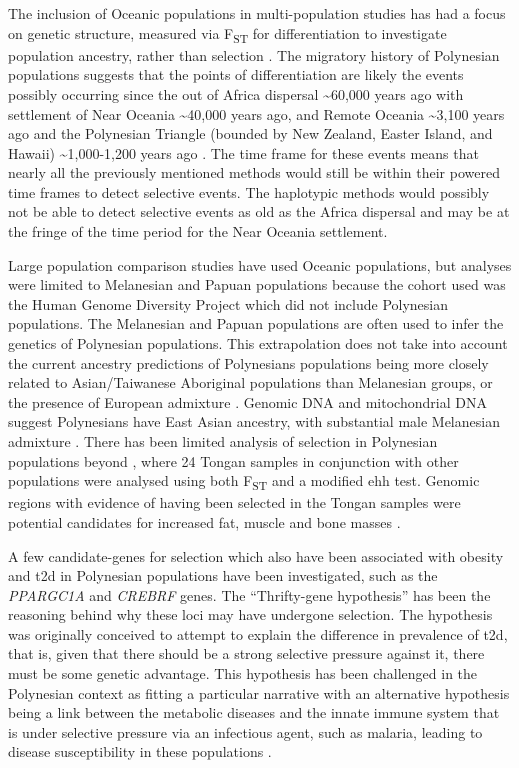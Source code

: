 \documentclass[twoside,openright]{report}
\begin{document}
The inclusion of Oceanic populations in multi-population studies has had
a focus on genetic structure, measured via F\textsubscript{ST} for
differentiation to investigate population ancestry, rather than
selection \citep{Friedlaender2008, Tennessen2011}. The migratory history
of Polynesian populations suggests that the points of differentiation
are likely the events possibly occurring since the out of Africa
dispersal \textasciitilde{}60,000 years ago \citep{Soares2012} with
settlement of Near Oceania \textasciitilde{}40,000 years ago, and Remote
Oceania \textasciitilde{}3,100 years ago \citep{Matisoo-Smith2004} and
the Polynesian Triangle (bounded by New Zealand, Easter Island, and
Hawaii) \textasciitilde{}1,000-1,200 years ago \citep{Wilmshurst2011}.
The time frame for these events means that nearly all the previously
mentioned methods would still be within their powered time frames to
detect selective events. The haplotypic methods would possibly not be
able to detect selective events as old as the Africa dispersal and may
be at the fringe of the time period for the Near Oceania settlement.

Large population comparison studies have used Oceanic populations, but
analyses were limited to Melanesian and Papuan populations because the
cohort used was the Human Genome Diversity Project \citep{Cann2002}
which did not include Polynesian populations. The Melanesian and Papuan
populations are often used to infer the genetics of Polynesian
populations. This extrapolation does not take into account the current
ancestry predictions of Polynesians populations being more closely
related to Asian/Taiwanese Aboriginal populations than Melanesian
groups, or the presence of European admixture \citep{Friedlaender2008}.
Genomic DNA and mitochondrial DNA suggest Polynesians have East Asian
ancestry, with substantial male Melanesian admixture
\citep{Kayser2008a}. There has been limited analysis of selection in
Polynesian populations beyond \citet{Kimura2008}, where 24 Tongan
samples in conjunction with other populations were analysed using both
F\textsubscript{ST} and a modified \gls{ehh} test. Genomic regions with
evidence of having been selected in the Tongan samples were potential
candidates for increased fat, muscle and bone masses \citep{Kimura2008}.

A few candidate-genes for selection which also have been associated with
obesity and \gls{t2d} in Polynesian populations have been investigated,
such as the \emph{PPARGC1A} \citep{Myles2011} and \emph{CREBRF}
\citep{Minster2016} genes. The ``Thrifty-gene hypothesis''
\citep{Neel1962} has been the reasoning behind why these loci may have
undergone selection. The hypothesis was originally conceived to attempt
to explain the difference in prevalence of \gls{t2d}, that is, given
that there should be a strong selective pressure against it, there must
be some genetic advantage. This hypothesis has been challenged in the
Polynesian context as fitting a particular narrative
\citep{Gosling2014, Gosling2015, Cadzow2016} with an alternative
hypothesis being a link between the metabolic diseases and the innate
immune system that is under selective pressure via an infectious agent,
such as malaria, leading to disease susceptibility in these populations
\citep{Gosling2015}.
\end{document}
